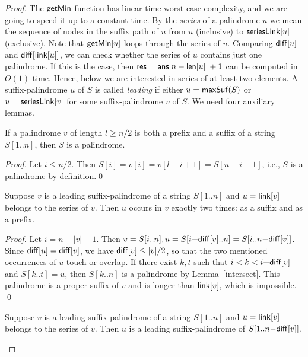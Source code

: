 \documentclass{llncs}
\def\maxsuf{{\sf maxSuf}}
\def\len{{\sf len}}
\def\link{{\sf link}}
\def\series{{\sf seriesLink}}
\def\ans{{\sf ans}}
\def\diff{{\sf diff}}
\def\getmin{{\sf getMin}}
\def\res{{\sf res}}
\begin{document}
\begin{proof}
The $\getmin$ function has linear-time worst-case complexity, and we are going to speed it up to a constant time. By the \emph{series} of a palindrome $u$ we mean the sequence of nodes in the suffix path of $u$ from $u$ (inclusive) to $\series[u]$ (exclusive). Note that $\getmin[u]$ loops through the series of $u$. Comparing $\diff[u]$ and $\diff[\link[u]]$, we can check whether the series of $u$ contains just one palindrome. If this is the case, then $\res=\ans[n-\len[u]]+1$ can be computed in $O(1)$ time. Hence, below we are interested in series of at least two elements. A suffix-palindrome $u$ of $S$ is called \emph{leading} if either $u=\maxsuf(S)$ or $u=\series[v]$ for some suffix-palindrome $v$ of $S$. We need four auxiliary lemmas.

\begin{lemma}\label{intersect}
If a palindrome $v$ of length $l\ge n/2$ is both a prefix and a suffix of a string $S[1..n]$, then $S$ is a palindrome.
\end{lemma}

\begin{proof}
Let $i \le n/2$. Then $ S[i]=v[i]=v[l-i+1]=S[n-i+1] $, i.e., $S$ is a palindrome by definition.\qed
\end{proof}

\begin{lemma}\label{prevocc}
Suppose $v$ is a leading suffix-palindrome of a string $S[1..n]$ and $u=\link[v]$ belongs to the series of $v$. Then $u$ occurs in $v$ exactly two times: as a suffix and as a prefix.\end{lemma}

\begin{proof}
Let $i = n - |v| + 1$. Then $v = S[i..n], u=S[i{+}\diff[v]..n]=S[i..n{-}\diff[v]]$. Since $\diff[u]=\diff[v]$, we have $\diff[v]\le |v|/2$, so that the two mentioned occurrences of $u$ touch or overlap. If there exist $k,t$ such that $i<k<i{+}\diff[v]$ and $S[k..t] = u$, then $S[k..n]$ is a palindrome by Lemma~\ref{intersect}. This palindrome is a proper suffix of $v$ and is longer than $\link[v]$, which is impossible. \qed
\end{proof}

\begin{lemma} \label{maxseries} 
Suppose $v$ is a leading suffix-palindrome of a string $S[1..n]$ and $u=\link[v]$ belongs to the series of $v$. Then $u$ is a leading suffix-palindrome of $S[1..n{-}\diff[v]]$.
\end{lemma}


\end{proof}
\end{document}
